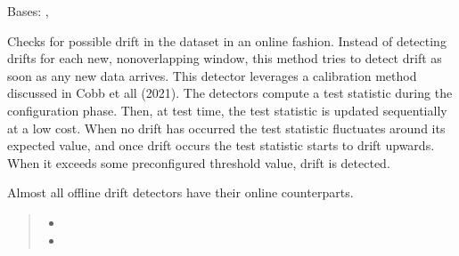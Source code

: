 \documentclass[letterpaper,10pt,english]{sphinxmanual}
\begin{document}
\begin{fulllineitems}
\label{\detokenize{alibiModules/onlineDetectors:onlineDetectors.onlineDetectors}}
\pysigstartsignatures
{}
\pysigstopsignatures
\sphinxAtStartPar
Bases: {\hyperref[\detokenize{baseModules/sampling:sampling.samplingData}]{}}, {\hyperref[\detokenize{baseModules/base:base.detectorParent}]{}}

\begin{fulllineitems}
\label{\detokenize{alibiModules/onlineDetectors:onlineDetectors.onlineDetectors.__init__}}
\pysigstartsignatures
{}
\pysigstopsignatures
\sphinxAtStartPar
Checks for possible drift in the dataset in an online fashion. Instead of detecting drifts
for each new, non\sphinxhyphen{}overlapping window, this method tries to detect drift as soon as any new
data arrives. This detector leverages a calibration method discussed in Cobb et all (2021).
The detectors compute a test statistic  during the configuration phase. Then, at test time,
the test statistic is updated sequentially at a low cost. When no drift has occurred the test
statistic fluctuates around its expected value, and once drift occurs the test statistic starts
to drift upwards. When it exceeds some preconfigured threshold value, drift is detected.

\sphinxAtStartPar
Almost all offline drift detectors have their online counterparts.
\begin{quote}\begin{description}
\sphinxAtStartPar
\begin{itemize}
\item {} 
\sphinxAtStartPar
{}

\item {} 
\sphinxAtStartPar
{}


\end{itemize}
\end{description}
\end{quote}
\end{fulllineitems}
\end{fulllineitems}
\end{document}
